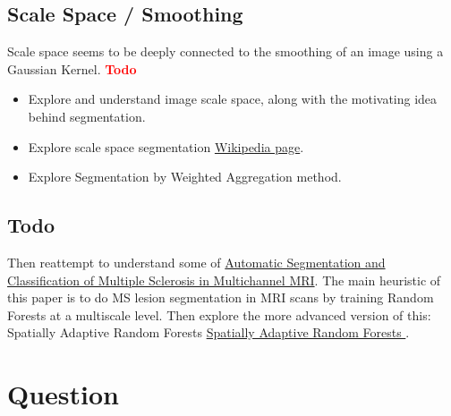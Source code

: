 \documentclass{report}
\begin{document}
\section{Scale Space / Smoothing}
Scale space seems to be deeply connected to the smoothing of an image using a Gaussian Kernel. 
\textbf{\textcolor{red}{Todo}}
\begin{itemize}
\item Explore and understand image scale space, along with the motivating idea behind segmentation. 
\item Explore scale space segmentation \href{https://en.wikipedia.org/wiki/Scale-space_segmentation}{Wikipedia page}.
\item Explore Segmentation by Weighted Aggregation method.
\end{itemize}

\section{Todo}
Then reattempt to understand some of \href{https://ieeexplore.ieee.org/stamp/stamp.jsp?tp=&arnumber=5238795}{Automatic Segmentation and Classification
of Multiple Sclerosis in Multichannel MRI}. The main heuristic of this paper is to do MS lesion segmentation in MRI scans by training Random Forests at a multiscale level. Then explore the more advanced version of this: Spatially Adaptive Random Forests \href{https://ieeexplore.ieee.org/document/6556781}{Spatially Adaptive Random Forests
}.

\chapter{Question}

\end{document}
